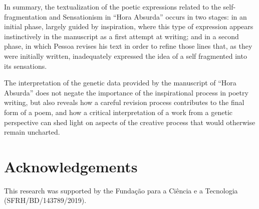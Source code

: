 \begin{paper}
In summary, the textualization of the poetic expressions related to the
self-fragmentation and Sensationism in ``Hora Absurda'' occurs in two
stages: in an initial phase, largely guided by inspiration, where this
type of expression appears instinctively in the manuscript as a first
attempt at writing; and in a second phase, in which Pessoa revises his
text in order to refine those lines that, as they were initially
written, inadequately expressed the idea of a self fragmented
into its sensations.

The interpretation of the genetic data provided by the manuscript of
``Hora Absurda'' does not negate the importance of the inspirational
process in poetry writing, but also reveals how a careful revision
process contributes to the final form of a poem, and how a critical
interpretation of a work from a genetic perspective can shed light on
aspects of the creative process that would otherwise remain uncharted.

\section*{Acknowledgements}
This research was supported by the Fundação para a Ciência e a Tecnologia (SFRH/BD/143789/2019).

\begin{flushleft}
    \renewcommand*{\mkbibnamefamily}[1]{\textsc{#1}}
    \renewcommand*{\mkbibnamegiven}[1]{\textsc{#1}} 
\printbibliography
\end{flushleft}

\end{paper}
